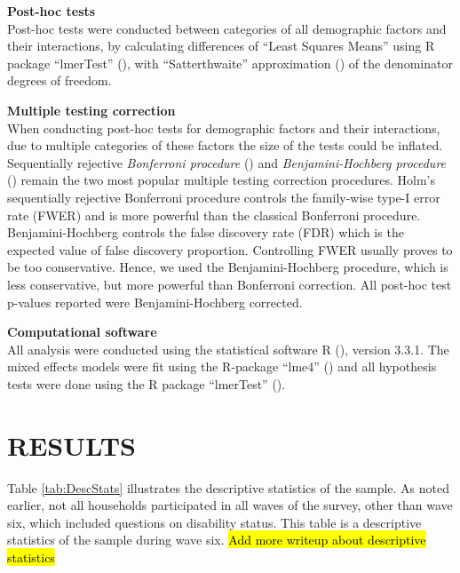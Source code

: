 \documentclass[11pt]{extarticle} %
\begin{document}
\noindent
{\bf{Post-hoc tests}} \\
Post-hoc tests were conducted between categories of all demographic factors and their interactions, by calculating differences of ``Least Squares Means'' using R package ``lmerTest'' (\cite{Kuznetsova_etal_2015_R-lmerTest}), with ``Satterthwaite'' approximation (\cite{Satterthwaite_1946_Biometrics}) of the denominator degrees of freedom.

\noindent
{\bf{Multiple testing correction}}\\
When conducting post-hoc tests for demographic factors and their interactions, due to multiple categories of these factors the size of the tests could be inflated. Sequentially rejective {\emph{Bonferroni procedure}} (\cite{Holm_1979_SJS}) and {\emph{Benjamini-Hochberg procedure}} (\cite{Benjamini_Hochberg_1995_JRSSB}) remain the two most popular multiple testing correction procedures. Holm's sequentially rejective Bonferroni procedure controls the family-wise type-I error rate (FWER) and is more powerful than the classical Bonferroni procedure. Benjamini-Hochberg controls the false discovery rate (FDR) which is the expected value of false discovery proportion. Controlling FWER usually proves to be too conservative. Hence, we used the Benjamini-Hochberg procedure, which is less conservative, but more powerful than Bonferroni correction. All post-hoc test p-values reported were Benjamini-Hochberg corrected.

\noindent
{\bf{Computational software}}\\
All analysis were conducted using the statistical software R (\cite{R}), version 3.3.1. The mixed effects models were fit using the R-package ``lme4'' (\cite{R-lme4}) and all hypothesis tests were done using the R package ``lmerTest'' (\cite{Kuznetsova_etal_2015_R-lmerTest}). 

\section*{RESULTS}
Table \ref{tab:DescStats} illustrates the descriptive statistics of the sample. As noted earlier, not all households participated in all waves of the survey, other than wave six, which included questions on disability status. This table is a descriptive statistics of the sample during wave six. {\hl{Add more writeup about descriptive statistics}}
\end{document}
